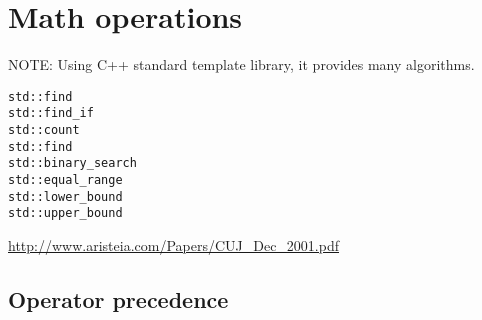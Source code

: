 \chapter{Math operations}

NOTE: Using C++ standard template library, it provides many algorithms. 
\begin{Verbatim}
std::find
std::find_if
std::count
std::find
std::binary_search
std::equal_range
std::lower_bound
std::upper_bound
\end{Verbatim} 
\url{http://www.aristeia.com/Papers/CUJ_Dec_2001.pdf}

\section{Operator precedence}
\label{sec:precedence}


